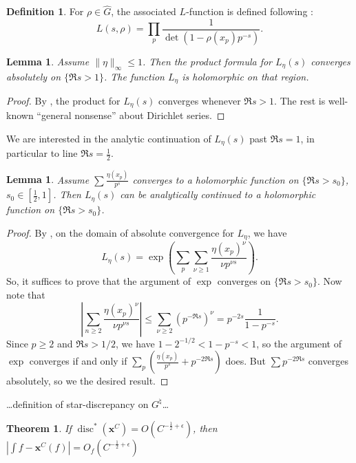 \documentclass{article}
\DeclareMathOperator{\disc}{disc}
\newcommand{\bx}{\boldsymbol{x}}
\newtheorem{theorem}[subsection]{Theorem}
\newtheorem{lemma}[subsection]{Lemma}
\theoremstyle{definition}
\newtheorem{definition}[subsection]{Definition}
\begin{document}
\begin{definition}
For $\rho\in \widehat G$, the associated $L$-function is defined following 
\cite{serre-1968}:
\[
	L(s,\rho) = \prod_p \frac{1}{\det(1-\rho(x_p) p^{-s})} .
\]
\end{definition}

\begin{lemma}
Assume $\|\eta\|_\infty \leqslant 1$. Then the product formula for 
$L_\eta(s)$ converges absolutely on $\{\Re s>1\}$. The function $L_\eta$ is 
holomorphic on that region. 
\end{lemma}
\begin{proof}
By \cite[\S3.7, Th.~5]{knopp-1956}, the product for $L_\eta(s)$ converges 
whenever $\Re s>1$. The rest is well-known ``general nonsense'' about Dirichlet 
series. 
\end{proof}

We are interested in the analytic continuation of $L_\eta(s)$ past $\Re s=1$, 
in particular to line $\Re s=\frac 1 2$. 

\begin{lemma}
Assume $\sum \frac{\eta(x_p)}{p^s}$ converges to a holomorphic function on  
$\{\Re s>s_0\}$, $s_0\in \left[\frac 1 2, 1\right]$. Then $L_\eta(s)$ can be 
analytically continued to a holomorphic function on $\{\Re s > s_0\}$. 
\end{lemma}
\begin{proof}
By \cite[11.9, Ex.~2]{apostol-1976}, on the domain of absolute convergence for 
$L_\eta$, we have 
\[
	L_\eta(s) = \exp\left(\sum_p \sum_{\nu\geqslant 1} \frac{\eta(x_p)^\nu}{\nu p^{\nu s}}\right) .
\]
So, it suffices to prove that the argument of $\exp$ converges on 
$\{\Re s>s_0\}$. Now note that 
\[
	\left|\sum_{n\geqslant 2} \frac{\eta(x_p)^\nu}{\nu p^{\nu s}}\right|
		\leqslant \sum_{\nu\geqslant 2} (p^{-\Re s})^\nu 
		= p^{-2 s} \frac{1}{1-p^{-s}} .
\]
Since $p\geqslant 2$ and $\Re s>1/2$, we have $1-2^{-1/2}<1-p^{-s}<1$, so the 
argument of $\exp$ converges if and only if 
$\sum_p \left(\frac{\eta(x_p)}{p^s} + p^{-2\Re s}\right)$ does. But 
$\sum p^{-2\Re s}$ converges absolutely, so we the desired result. 
\end{proof}

\ldots definition of star-discrepancy on $G^\natural$\ldots

\begin{theorem}
If $\disc^\ast(\bx^C) = O(C^{-\frac 1 2+\epsilon})$, then 
$\left|\int f - \bx^C(f)\right| = O_f(C^{-\frac 1 2+\epsilon})$
\end{theorem}
\end{document}
